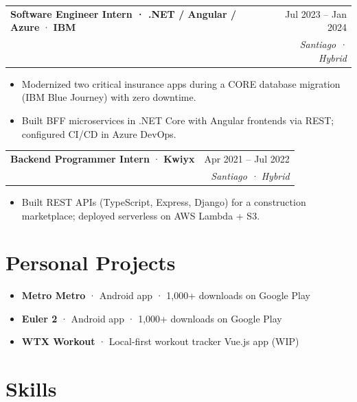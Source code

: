 \documentclass[9.5pt, a4paper]{article}
\makeatletter
\newcommand{\experience}[4]{%
  \noindent
  \begin{tabularx}{\linewidth}{@{}X r@{}}
    \textbf{#1} \textcolor{muted}{·} \textbf{#2} & \textcolor{muted}{\small #3}\\[-0.1em]
    & \textcolor{muted}{\small\itshape #4}
  \end{tabularx}
  \vspace{0.04em}
}
\makeatother
\begin{document}
\experience{Software Engineer Intern · .NET / Angular / Azure}{IBM}{Jul 2023 – Jan 2024}{Santiago · Hybrid}
\begin{itemize}
  \item Modernized two critical insurance apps during a CORE database migration (IBM Blue Journey) with zero downtime.
  \item Built BFF microservices in .NET Core with Angular frontends via REST; configured CI/CD in Azure DevOps.
\end{itemize}
\vspace{0.4em}

\experience{Backend Programmer Intern}{Kwiyx}{Apr 2021 – Jul 2022}{Santiago · Hybrid}
\begin{itemize}
  \item Built REST APIs (TypeScript, Express, Django) for a construction marketplace; deployed serverless on AWS Lambda + S3.
\end{itemize}
\vspace{0.4em}

\section{Personal Projects}

\begin{itemize}
  \item \textbf{Metro Metro} \textcolor{muted}{·} Android app · 1,000+ downloads on Google Play \enspace \href{https://play.google.com/store/apps/details?id=com.jorgecruces.metrometro}{\faGooglePlay} \enspace \href{https://github.com/jcrucesdeveloper/Metro-metro}{\faGithub}
  \item \textbf{Euler 2} \textcolor{muted}{·} Android app · 1,000+ downloads on Google Play \enspace \href{https://play.google.com/store/apps/details?id=com.jorgecruces.euler2}{\faGooglePlay}
  \item \textbf{WTX Workout} \textcolor{muted}{·} Local-first workout tracker Vue.js app \textcolor{muted}{(WIP)} \enspace \href{https://wtxworkout.com/}{\faGlobe} \enspace \href{https://github.com/jcrucesdeveloper/wtx-app}{\faGithub}
\end{itemize}

\section{Skills}
\end{document}
